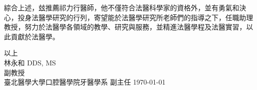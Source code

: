 \documentclass{letter}
\begin{document}
\begin{letter}

綜合上述，玆推薦祁力行醫師，他不僅符合法醫科學家的資格外，並有勇氣和決心，投身法醫學研究的行列，寄望能於法醫學研究所老師們的指導之下，任職助理教授，努力於法醫學各領域的教學、研究與服務，並精進法醫學程及法醫實習，以此貢獻於法醫學。

\medskip
以上 \vspace{5mm} \\ 
林永和 DDS, MS \\
副教授 \\
臺北醫學大學口腔醫學院牙醫學系 副主任 \hspace{5mm} \today


\clearpage

%


\end{letter}
\end{document}
